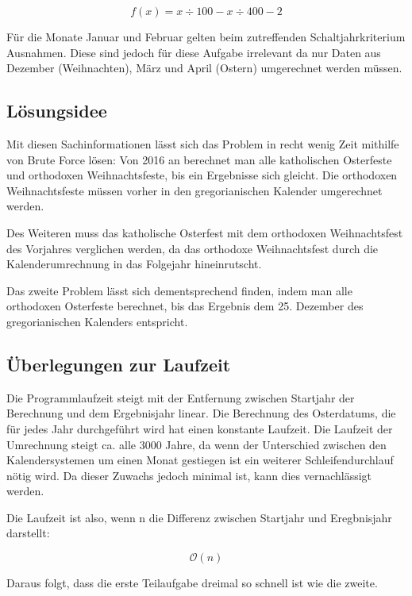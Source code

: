 	\[f(x)=x\div{}100-x\div{}400-2\]

	Für die Monate Januar und Februar gelten beim zutreffenden Schaltjahrkriterium Ausnahmen. Diese sind jedoch für diese Aufgabe irrelevant da nur Daten aus Dezember (Weihnachten), März und April (Ostern) umgerechnet werden müssen.

\clearpage
\subsection {Lösungsidee}
	Mit diesen Sachinformationen lässt sich das Problem in recht wenig Zeit mithilfe von Brute Force lösen: Von 2016 an berechnet man alle katholischen Osterfeste und orthodoxen Weihnachtsfeste, bis ein Ergebnisse sich gleicht. Die orthodoxen Weihnachtsfeste müssen vorher in den gregorianischen Kalender umgerechnet werden. 

	Des Weiteren muss das katholische Osterfest mit dem orthodoxen Weihnachtsfest des Vorjahres verglichen werden, da das orthodoxe Weihnachtsfest  durch die Kalenderumrechnung in das Folgejahr hineinrutscht.

	Das zweite Problem lässt sich dementsprechend finden, indem man alle orthodoxen Osterfeste berechnet, bis das Ergebnis dem 25. Dezember des gregorianischen Kalenders entspricht.

\subsection {Überlegungen zur Laufzeit}
Die Programmlaufzeit steigt mit der Entfernung zwischen Startjahr der Berechnung und dem Ergebnisjahr linear. Die Berechnung des Osterdatums, die für jedes Jahr durchgeführt wird hat einen konstante Laufzeit. Die Laufzeit der Umrechnung steigt ca. alle 3000 Jahre, da wenn der Unterschied zwischen den Kalendersystemen um einen Monat gestiegen ist ein weiterer Schleifendurchlauf nötig wird. Da dieser Zuwachs jedoch minimal ist, kann dies vernachlässigt werden.

Die Laufzeit ist also, wenn n die Differenz zwischen Startjahr und Eregbnisjahr darstellt:

\[\mathcal O(n)\]

Daraus folgt, dass die erste Teilaufgabe dreimal so schnell ist wie die zweite.